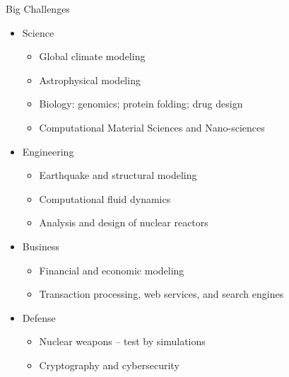 \documentclass[xcolor=x11names,compress]{beamer}
\renewcommand{\(}{\begin{columns}}
\renewcommand{\)}{\end{columns}}
\newcommand{\<}[1]{\begin{column}{#1}}
\renewcommand{\>}{\end{column}}
\begin{document}
\begin{frame}{Big Challenges}
\begin{itemize}
\item Science
\begin{itemize}
\item Global climate modeling
\item Astrophysical modeling
\item Biology: genomics; protein folding; drug design
\item \alert{Computational Material Sciences} and Nano-sciences
\end{itemize}
\item Engineering
\begin{itemize}
\item Earthquake and structural modeling
\item \alert{Computational fluid dynamics} 
\item Analysis and design of \alert{nuclear reactors}
\end{itemize}
\item Business
\begin{itemize}
\item Financial and economic modeling
\item Transaction processing, web services, and search engines
\end{itemize}
\item Defense
\begin{itemize}
\item Nuclear weapons -- test by simulations
\item Cryptography and cybersecurity
\end{itemize}
\end{itemize}
\end{frame}

\end{document}
